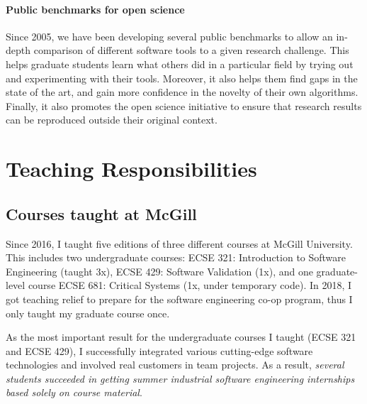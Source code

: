 \paragraph{Public benchmarks for open science}
Since 2005, we have been developing several public benchmarks to allow an in-depth comparison of different software tools to a given research challenge. This helps graduate students learn what others did in a particular field by trying out and experimenting with their tools. Moreover, it also helps them find gaps in the state of the art, and gain more confidence in the novelty of their own algorithms. Finally, it also promotes the open science initiative to ensure that research results can be reproduced outside their original context.








\section{Teaching Responsibilities}
\label{sec:teaching-responsibilities}

\subsection{Courses taught at McGill}
Since 2016, I taught five editions of three different courses at McGill University. This includes two undergraduate courses: ECSE 321: Introduction to Software Engineering (taught 3x), ECSE 429: Software Validation (1x), and one graduate-level course ECSE 681: Critical Systems (1x, under temporary code). In 2018, I got teaching relief to prepare for the software engineering co-op program, thus I only taught my graduate course once. 

As the most important result for the undergraduate courses I taught (ECSE 321 and ECSE 429), I successfully integrated various cutting-edge software technologies and involved real customers in team projects. As a result, \emph{several students succeeded in getting summer industrial software engineering internships based solely on course material}. 

